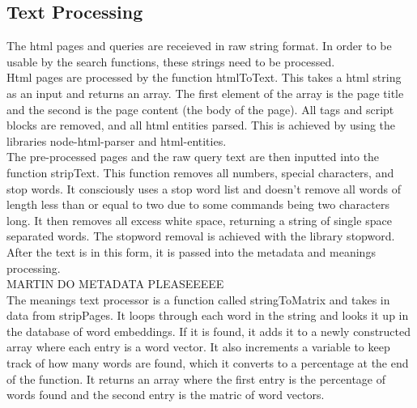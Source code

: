 \subsection{Text Processing}
The html pages and queries are receieved in raw string format. In order to be usable by the search functions, these strings need to be processed. \\
Html pages are processed by the function htmlToText. This takes a html string as an input and returns an array. The first element of the array is the page title and the second is the page content (the body of the page). All tags and script blocks are removed, and all html entities parsed. This is achieved by using the libraries node-html-parser and html-entities. \\ 
The pre-processed pages and the raw query text are then inputted into the function stripText. This function removes all numbers, special characters, and stop words. It consciously uses a stop word list and doesn't remove all words of length less than or equal to two due to some commands being two characters long. It then removes all excess white space, returning a string of single space separated words. The stopword removal is achieved with the library stopword. \\
After the text is in this form, it is passed into the metadata and meanings processing. \\
MARTIN DO METADATA PLEASEEEEE\\
The meanings text processor is a function called stringToMatrix and takes in data from stripPages. It loops through each word in the string and looks it up in the database of word embeddings. If it is found, it adds it to a newly constructed array where each entry is a word vector. It also increments a variable to keep track of how many words are found, which it converts to a percentage at the end of the function. It returns an array where the first entry is the percentage of words found and the second entry is the matric of word vectors.

